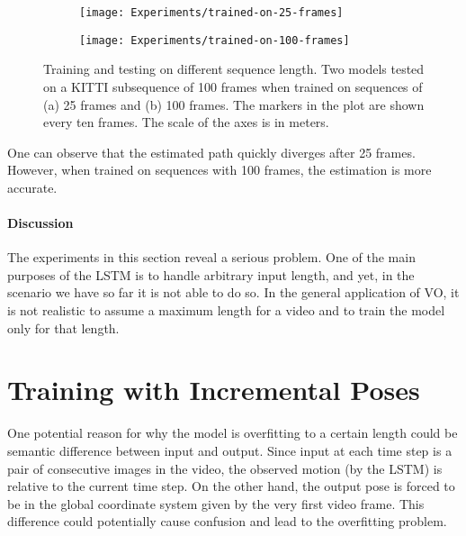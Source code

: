 		\begin{figure}
			\centering
			\begin{subfigure}[b]{0.5\linewidth}
				\centering
				\texttt{[image: Experiments/trained-on-25-frames]}
				\caption{
					\label{fig:0}
				}
			\end{subfigure}%
			\begin{subfigure}[b]{0.5\linewidth}
				\centering
				\texttt{[image: Experiments/trained-on-100-frames]}
				\caption{
					\label{fig:1}
				}
			\end{subfigure}%
			\caption[Training and testing on different sequence length]
					{Training and testing on different sequence length. 
					 Two models tested on a KITTI subsequence of 100 frames when trained on sequences of (a) 25 frames and (b) 100 frames. 
					 The markers in the plot are shown every ten frames.
					 The scale of the axes is in meters.
					 \label{fig:kitti-testing-on-longer-sequences}}
		\end{figure}
		One can observe that the estimated path quickly diverges after 25 frames.
		However, when trained on sequences with 100 frames, the estimation is more accurate.
		
		\paragraph{Discussion}
		The experiments in this section reveal a serious problem.
		One of the main purposes of the LSTM is to handle arbitrary input length, and yet, in the scenario we have so far it is not able to do so.
		In the general application of VO, it is not realistic to assume a maximum length for a video and to train the model only for that length.
		
		
	\section{Training with Incremental Poses}
		One potential reason for why the model is overfitting to a certain length could be semantic difference between input and output.
		Since input at each time step is a pair of consecutive images in the video, the observed motion (by the LSTM) is relative to the current time step.
		On the other hand, the output pose is forced to be in the global coordinate system given by the very first video frame.
		This difference could potentially cause confusion and lead to the overfitting problem.
		
